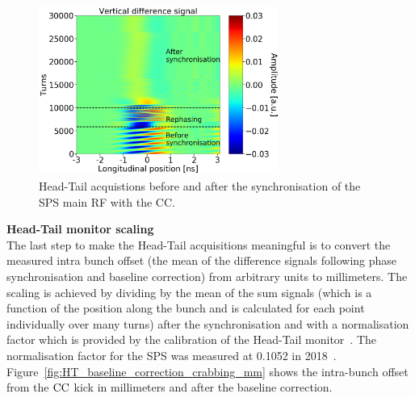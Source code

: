 \begin{figure}[!h]
    \centering         
    \includegraphics[width=0.7\textwidth]{images/Ch4/HT_2D__20180530_135105_before_after_sunchronisation_new_version.png}
        \caption{Head-Tail acquistions before and after the synchronisation of the SPS main RF with the CC.}
        \label{fig:HT_baseline_correction_measurements_2D}
 \end{figure}



\normalsize{\textbf{Head-Tail monitor scaling}}\\
The last step to make the Head-Tail acquisitions meaningful is to convert the measured intra bunch offset (the mean of the difference signals following phase synchronisation and baseline correction) from arbitrary units to millimeters. The scaling is achieved by dividing by the mean of the sum signals (which is a function of the position along the bunch and is calculated for each point individually over many turns) after the synchronisation and with a normalisation factor which is provided by the calibration of the Head-Tail monitor~\cite{PhysRevAccelBeams.22.112803}. The normalisation factor for the SPS was measured at 0.1052 in 2018~\cite{HT_calibration_2018}. Figure~\ref{fig:HT_baseline_correction_crabbing_mm} shows the intra-bunch offset from the ${\mathrm{CC}}$ kick in millimeters and after the baseline correction. 

